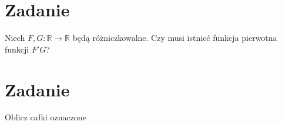 \documentclass[11pt]{scrartcl}
\begin{document}
        \section{Zadanie}
                 \begin{zadanie}
                     Niech $F,G: \mathbb{R} \to \mathbb{R} $ będą różniczkowalne. Czy musi istnieć funkcja pierwotna funkcji $F'G$?
                 \end{zadanie}
                 
        \section{Zadanie}
        \begin{zadanie}
            Oblicz całki oznaczone
        \end{zadanie}
        
\end{document}
